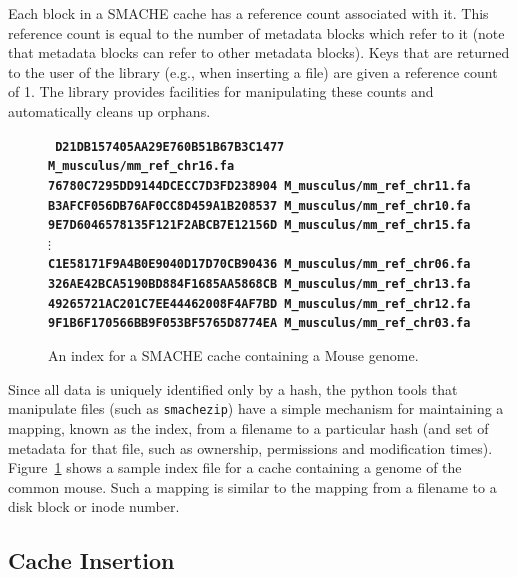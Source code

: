 \documentclass{sigplanconf}[11pt]
\begin{document}
Each block in a SMACHE cache has a reference count associated with it.  This
reference count is equal to the number of metadata blocks which refer to it
(note that metadata blocks can refer to other metadata blocks).  Keys that are
returned to the user of the library (e.g., when inserting a file) are given a
reference count of 1.  The library provides facilities for manipulating these
counts and automatically cleans up orphans.

\begin{figure}[htb]
\begin{center}
{\tiny {\bf {\tt
D21DB157405AA29E760B51B67B3C1477 M\_musculus/mm\_ref\_chr16.fa \\
76780C7295DD9144DCECC7D3FD238904 M\_musculus/mm\_ref\_chr11.fa \\
B3AFCF056DB76AF0CC8D459A1B208537 M\_musculus/mm\_ref\_chr10.fa \\
9E7D6046578135F121F2ABCB7E12156D M\_musculus/mm\_ref\_chr15.fa \\
$\vdots$ \\
C1E58171F9A4B0E9040D17D70CB90436 M\_musculus/mm\_ref\_chr06.fa \\
326AE42BCA5190BD884F1685AA5868CB M\_musculus/mm\_ref\_chr13.fa \\
49265721AC201C7EE44462008F4AF7BD M\_musculus/mm\_ref\_chr12.fa \\
9F1B6F170566BB9F053BF5765D8774EA M\_musculus/mm\_ref\_chr03.fa \\
}}}
\caption{\label{fig:index}An index for a SMACHE cache containing a Mouse genome.}
\end{center}
\end{figure}

Since all data is uniquely identified only by a hash, the python tools that
manipulate files (such as {\tt smachezip}) have a simple mechanism for
maintaining a mapping, known as the index, from a filename to a particular hash
(and set of metadata for that file, such as ownership, permissions and
modification times).  Figure~\ref{fig:index} shows a sample index file for a
cache containing a genome of the common mouse.  Such a mapping is similar to
the mapping from a filename to a disk block or inode number.

\subsection{Cache Insertion}
\end{document}
